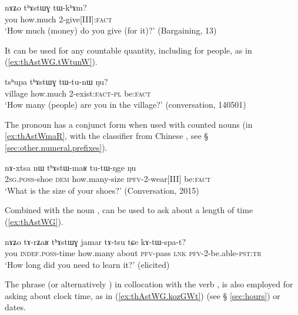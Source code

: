 \begin{exe}
\ex \label{ex:thAstWG.tWkhAm}
 \gll    nɤʑo 	tʰɤstɯɣ 	tɯ-kʰɤm?    \\
 you how.much 2-give[III]:\textsc{fact}  \\
\glt  `How much (money) do you give (for it)?' (Bargaining, 13)
\end{exe} 

It can be used for any countable quantity, including for people, as in (\ref{ex:thAstWG.tWtunW}).

\begin{exe}
\ex \label{ex:thAstWG.tWtunW}
 \gll
tsʰupa tʰɤstɯɣ tɯ-tu-nɯ ŋu? \\
village how.much 2-exist:\textsc{fact}-\textsc{pl} be:\textsc{fact} \\
\glt `How many (people) are you in the village?' (conversation, 140501)
\end{exe} 

The pronoun  has a conjunct form  when used with counted nouns (in \ref{ex:thAstWmaR}, with the classifier  from Chinese  , see § \ref{sec:other.numeral.prefixes}).

 \begin{exe}
\ex \label{ex:thAstWmaR}
 \gll   nɤ-xtsa nɯ tʰɤstɯ-maʁ tu-tɯ-ŋge ŋu   \\
\textsc{2sg.poss}-shoe \textsc{dem} how.many-size \textsc{ipfv}-2-wear[III] be:\textsc{fact} \\ 
\glt `What is the size of your shoes?'  (Conversation, 2015)
\end{exe} 

Combined with the noun , 	 can be used to ask about a length of time (\ref{ex:thAstWG}).

\begin{exe}
\ex \label{ex:thAstWG}
 \gll   nɤʑo 	tɤ-rʑaʁ 	tʰɤstɯɣ 	jamar 	tɤ-tsu tɕe 	kɤ-tɯ-spa-t?  \\
 you \textsc{indef.poss}-time how.many about \textsc{pfv}-pass \textsc{lnk} \textsc{pfv}-2-be.able-\textsc{pst:tr} \\
\glt   `How long did you need to learn it?' (elicited)
\end{exe} 

The phrase  (or alternatively ) in collocation with the verb , is also employed for asking about clock time, as in (\ref{ex:thAstWG.kozGWt}) (see § \ref{sec:hours}) or dates. %

